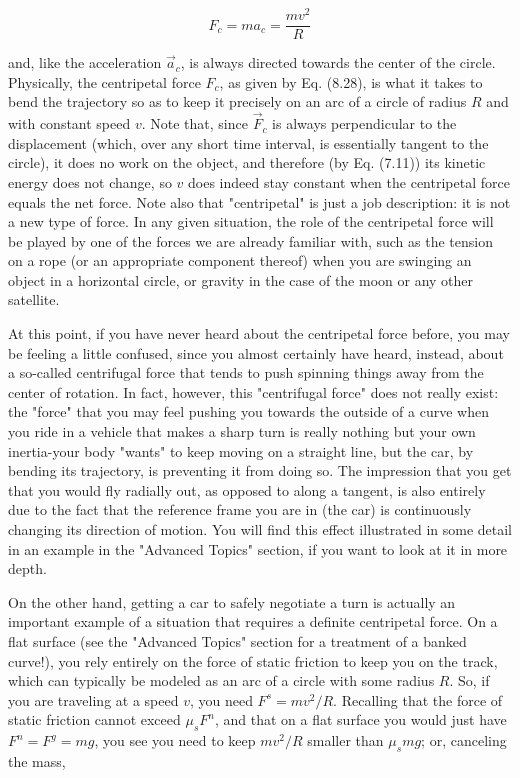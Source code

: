 \documentclass[10pt]{article}
\begin{document}
\begin{equation*}
F_{c}=m a_{c}=\frac{m v^{2}}{R} \tag{8.28}
\end{equation*}


and, like the acceleration $\vec{a}_{c}$, is always directed towards the center of the circle.\\
Physically, the centripetal force $F_{c}$, as given by Eq. (8.28), is what it takes to bend the trajectory so as to keep it precisely on an arc of a circle of radius $R$ and with constant speed $v$. Note that, since $\vec{F}_{c}$ is always perpendicular to the displacement (which, over any short time interval, is essentially tangent to the circle), it does no work on the object, and therefore (by Eq. (7.11)) its kinetic energy does not change, so $v$ does indeed stay constant when the centripetal force equals the net force. Note also that "centripetal" is just a job description: it is not a new type of force. In any given situation, the role of the centripetal force will be played by one of the forces we are already familiar with, such as the tension on a rope (or an appropriate component thereof) when you are swinging an object in a horizontal circle, or gravity in the case of the moon or any other satellite.

At this point, if you have never heard about the centripetal force before, you may be feeling a little confused, since you almost certainly have heard, instead, about a so-called centrifugal force that tends to push spinning things away from the center of rotation. In fact, however, this "centrifugal force" does not really exist: the "force" that you may feel pushing you towards the outside of a curve when you ride in a vehicle that makes a sharp turn is really nothing but your own inertia-your body "wants" to keep moving on a straight line, but the car, by bending its trajectory, is preventing it from doing so. The impression that you get that you would fly radially out, as opposed to along a tangent, is also entirely due to the fact that the reference frame you are in (the car) is continuously\\
changing its direction of motion. You will find this effect illustrated in some detail in an example in the "Advanced Topics" section, if you want to look at it in more depth.

On the other hand, getting a car to safely negotiate a turn is actually an important example of a situation that requires a definite centripetal force. On a flat surface (see the "Advanced Topics" section for a treatment of a banked curve!), you rely entirely on the force of static friction to keep you on the track, which can typically be modeled as an arc of a circle with some radius $R$. So, if you are traveling at a speed $v$, you need $F^{s}=m v^{2} / R$. Recalling that the force of static friction cannot exceed $\mu_{s} F^{n}$, and that on a flat surface you would just have $F^{n}=F^{g}=m g$, you see you need to keep $m v^{2} / R$ smaller than $\mu_{s} m g$; or, canceling the mass,
\end{document}
